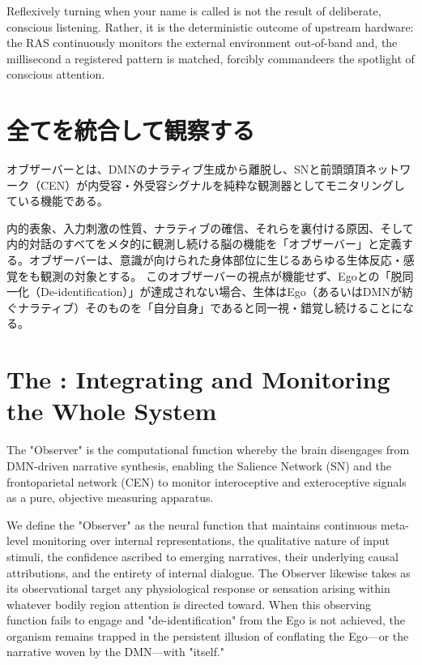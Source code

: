 Reflexively turning when your name is called is not the result of deliberate, conscious listening.
Rather, it is the deterministic outcome of upstream hardware: the RAS continuously monitors the external environment out-of-band and, the millisecond a registered pattern is matched, forcibly commandeers the spotlight of conscious attention.
\fi

\ifja
\section{全てを統合して観察する \jaAttentiveObserver}
オブザーバーとは、DMNのナラティブ生成から離脱し、SNと前頭頭頂ネットワーク（CEN）が内受容・外受容シグナルを純粋な観測器としてモニタリングしている機能である。

内的表象、入力刺激の性質、ナラティブの確信、それらを裏付ける原因、そして内的対話のすべてをメタ的に観測し続ける脳の機能を「オブザーバー」と定義する。オブザーバーは、意識が向けられた身体部位に生じるあらゆる生体反応・感覚をも観測の対象とする。
このオブザーバーの視点が機能せず、Egoとの「脱同一化（De-identification）」が達成されない場合、生体はEgo（あるいはDMNが紡ぐナラティブ）そのものを「自分自身」であると同一視・錯覚し続けることになる。
\else
    \section{The \fullAttentiveObserver: Integrating and Monitoring the Whole System}

The "Observer" is the computational function whereby the brain disengages from DMN-driven narrative synthesis, enabling the Salience Network (SN) and the frontoparietal network (CEN) to monitor interoceptive and exteroceptive signals as a pure, objective measuring apparatus.

We define the "Observer" as the neural function that maintains continuous meta-level monitoring over internal representations, the qualitative nature of input stimuli, the confidence ascribed to emerging narratives, their underlying causal attributions, and the entirety of internal dialogue. The Observer likewise takes as its observational target any physiological response or sensation arising within whatever bodily region attention is directed toward.
When this observing function fails to engage and "de-identification" from the Ego is not achieved, the organism remains trapped in the persistent illusion of conflating the Ego—or the narrative woven by the DMN—with "itself."
\fi
